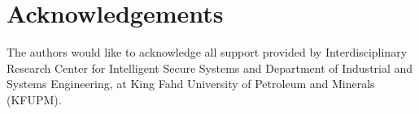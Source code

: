 \documentclass[a4paper,fleqn]{cas-sc}
\begin{document}


\section*{Acknowledgements}
The authors would like to acknowledge all support provided by Interdisciplinary Research Center for Intelligent Secure Systems and Department of Industrial and Systems Engineering, at King Fahd University of Petroleum and Minerals (KFUPM).

%


% 





\end{document}
